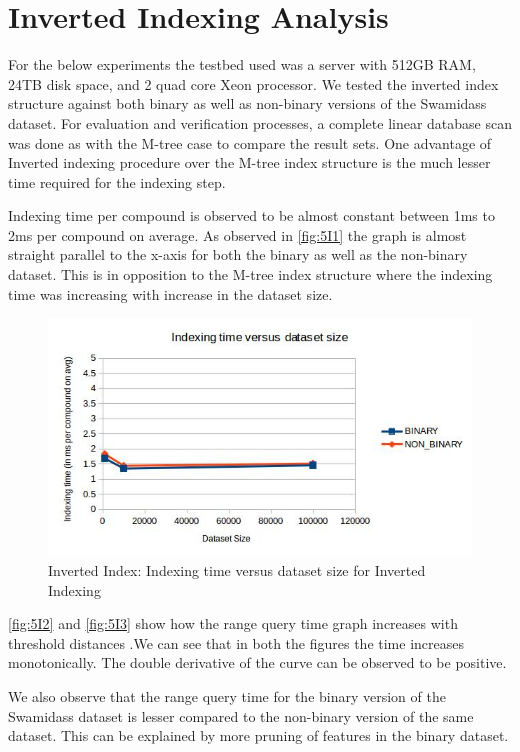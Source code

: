\section{Inverted Indexing Analysis}

For the below experiments the testbed used was a server with 512GB RAM, 24TB disk space, and 2 quad core Xeon processor. We tested the inverted index structure against both binary as well as non-binary versions of the Swamidass dataset. For evaluation and verification processes, a complete linear database scan was done as with the M-tree case to compare the result sets. One advantage of Inverted indexing procedure over the M-tree index structure is the much lesser time required for the indexing step. 

Indexing time per compound is observed to be almost constant between 1ms to 2ms per compound on average. As observed in \autoref{fig:5I1} the graph is almost straight parallel to the x-axis for both the binary as well as the non-binary dataset. This is in opposition to the M-tree index structure where the indexing time was increasing with increase in the dataset size. 


\begin{figure}[ht]	
\centering
\includegraphics[width=1 \columnwidth]{img/imageI1.jpg}
\caption{Inverted Index: Indexing time versus dataset size for Inverted Indexing}
\label{fig:5I1}
\end{figure}


\autoref{fig:5I2} and \autoref{fig:5I3} show how the range query time graph increases with threshold distances .We can see that in both the figures the time increases monotonically. The double derivative of the curve can be observed to be positive. 

We also observe that the range query time for the binary version of the Swamidass dataset is lesser compared to the non-binary version of the same dataset. This can be explained by more pruning of features in the binary dataset.

